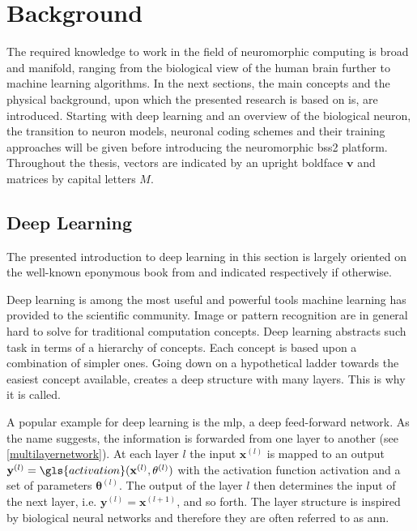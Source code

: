 \chapter{Background}
The required knowledge to work in the field of neuromorphic computing is broad and manifold, ranging from the biological view of the human brain further to machine learning algorithms. In the next sections, the main concepts and the physical background, upon which the presented research is based on is, are introduced. Starting with deep learning and an overview of the biological neuron, the transition to neuron models, neuronal coding schemes and their training approaches will be given before introducing the neuromorphic \gls{bss2} platform. Throughout the thesis, vectors are indicated by an upright boldface $\mathbf{v}$ and matrices by capital letters $M$.
\section{Deep Learning}
\label{deeplearning}
The presented introduction to deep learning in this section is largely oriented on the well-known eponymous book from \cite{Goodfellow-et-al-2016} and indicated respectively if otherwise.

Deep learning is among the most useful and powerful tools machine learning has provided to the scientific community. Image or pattern recognition are in general hard to solve for traditional computation concepts. Deep learning abstracts such task in terms of a hierarchy of concepts. Each concept is based upon a combination of simpler ones. Going down on a hypothetical ladder towards the easiest concept available, creates a deep structure with many layers. This is why it is called.

A popular example for deep learning is the \gls{mlp}, a deep feed-forward network. As the name suggests, the information is forwarded from one layer to another (see \cref{multilayernetwork}). At each layer $l$ the input $\mathbf{x}^{(l)}$ is mapped to an output $\mathbf{y}^{(l)} = \gls{activation}(\mathbf{x}^{(l)}, \mathbf{\theta}^{(l)})$ with the activation function \gls{activation} and a set of parameters $\mathbf{\theta}^{(l)}$. The output of the layer $l$ then determines the input of the next layer, i.e. $\mathbf{y}^{(l)} = \mathbf{x}^{(l+1)}$, and so forth. The layer structure is inspired by biological neural networks and therefore they are often referred to as \gls{ann}. 

